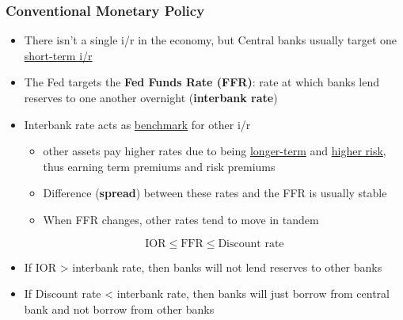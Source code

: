 \documentclass{article}
\begin{document}
\begin{multicols}{2}
\subsubsection{Conventional Monetary Policy}
\begin{itemize}
	\item There isn't a single i/r in the economy, but Central banks usually target one \underline{short-term i/r}
	\item The Fed targets the \textbf{Fed Funds Rate (FFR)}: rate at which banks lend reserves to one another overnight (\textbf{interbank rate})
	\item Interbank rate acts as \underline{benchmark} for other i/r
	\begin{itemize}
		\item other assets pay higher rates due to being \underline{longer-term} and \underline{higher risk}, thus earning term premiums and risk premiums
		\item Difference (\textbf{spread}) between these rates and the FFR is usually stable
		\item When FFR changes, other rates tend to move in tandem
	\end{itemize}
    $$\text{IOR} \leq \text{FFR} \leq \text{Discount rate}$$
    \item If IOR > interbank rate, then banks will not lend reserves to other banks
    \item If Discount rate < interbank rate, then banks will just borrow from central bank and not borrow from other banks
\end{itemize}

\end{multicols}
\end{document}
